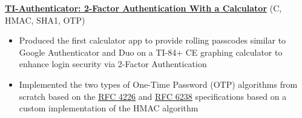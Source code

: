 \documentclass[letterpaper,11pt]{article}
\begin{document}
\textbf{\href{https://github.com/jshin313/ti-authenticator}{\underline{TI-Authenticator: 2-Factor Authentication With a Calculator}}} \hfill (C, HMAC, SHA1, OTP)
\begin{itemize}
    \item Produced the first calculator app to provide rolling passcodes similar to Google Authenticator and Duo on a TI-84+ CE graphing calculator to enhance login security via 2-Factor Authentication
    \item Implemented the two types of One-Time Password (OTP) algorithms from scratch based on the \href{https://tools.ietf.org/html/rfc4226}{\underline{RFC 4226}} and \href{https://tools.ietf.org/html/rfc6238}{\underline{RFC 6238}} specifications based on a custom implementation of the HMAC algorithm
\end{itemize}
\end{document}
